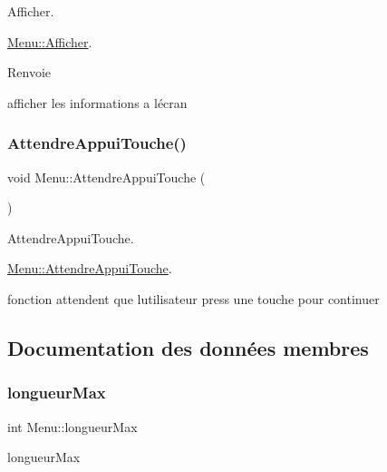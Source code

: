 Afficher. 

\hyperlink{class_menu_a079e0c6a24248a07993b48b310ba65ce}{Menu\+::\+Afficher}.

\begin{DoxyReturn}{Renvoie}

\end{DoxyReturn}
afficher les informations a l\textquotesingle{}écran \mbox{\label{class_menu_a6ddcaabf2fedb30f5136f3be655d60ce}} 
\subsubsection{\texorpdfstring{Attendre\+Appui\+Touche()}{AttendreAppuiTouche()}}
{\footnotesize\ttfamily void Menu\+::\+Attendre\+Appui\+Touche (\begin{DoxyParamCaption}{ }\end{DoxyParamCaption})\hspace{0.3cm}{\ttfamily [static]}}



Attendre\+Appui\+Touche. 

\hyperlink{class_menu_a6ddcaabf2fedb30f5136f3be655d60ce}{Menu\+::\+Attendre\+Appui\+Touche}.

fonction attendent que l\textquotesingle{}utilisateur press une touche pour continuer 

\subsection{Documentation des données membres}
\mbox{\label{class_menu_a745c540589015b573d8214e1080e2a8e}} 
\subsubsection{\texorpdfstring{longueur\+Max}{longueurMax}}
{\footnotesize\ttfamily int Menu\+::longueur\+Max\hspace{0.3cm}{\ttfamily [private]}}



longueur\+Max 

\mbox{\label{class_menu_ad59953635d184fefcddf95015a761187}} 
